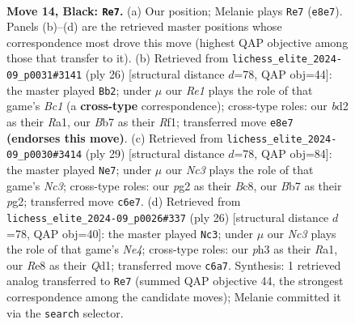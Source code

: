 \documentclass[11pt]{article}
\begin{document}
\clearpage

\begin{figure}[p]\centering
\begin{subfigure}{0.46\textwidth}\centering
\resizebox{\linewidth}{!}{%
\newchessgame
\chessboard[
  setfen={r2qrbk1/1bp2pp1/p1np3p/1p1Bp3/4P3/P2P1N1P/1PPB1PP1/R2QR1K1 b - - 0 14},
  showmover=false,
  pgfstyle=straightmove, color=movearrow, markmove={e8-e7}
]}
\caption{}
\end{subfigure}\hfill
\begin{subfigure}{0.46\textwidth}\centering
\resizebox{\linewidth}{!}{%
\newchessgame
\chessboard[
  setfen={r2q1rk1/pp3pp1/3pbn1p/4p3/1P1bP3/P1NB3P/2P1QPP1/R1B2RK1 w - - 0 14},
  showmover=false,
  pgfstyle=straightmove, color=movearrow, markmove={c1-b2}
]}
\caption{}
\end{subfigure}
\\[4pt]
\begin{subfigure}{0.46\textwidth}\centering
\resizebox{\linewidth}{!}{%
\newchessgame
\chessboard[
  setfen={1rbqrbk1/2p2pp1/2np3p/1p1Bp3/4P3/2PPBN1P/1P3PP1/R2Q1RK1 b - - 0 15},
  showmover=false,
  pgfstyle=straightmove, color=movearrow, markmove={c6-e7}
]}
\caption{}
\end{subfigure}\hfill
\begin{subfigure}{0.46\textwidth}\centering
\resizebox{\linewidth}{!}{%
\newchessgame
\chessboard[
  setfen={r2q1rk1/1p2bpp1/2p1pn1p/p4b2/2PPN3/1P4P1/PB3PBP/R2Q1RK1 w - - 1 14},
  showmover=false,
  pgfstyle=straightmove, color=movearrow, markmove={e4-c3}
]}
\caption{}
\end{subfigure}
\caption{\textbf{Move 14, Black: \texttt{Re7}.} (a) Our position; Melanie plays \texttt{Re7} (\texttt{e8e7}). Panels (b)--(d) are the retrieved master positions whose correspondence most drove this move (highest QAP objective among those that transfer to it). (b) Retrieved from \texttt{lichess\_elite\_2024-09\_p0031\#3141} (ply 26) [structural distance $d$=78, QAP obj=44]: the master played \texttt{Bb2}; under $\mu$ our \emph{Re1} plays the role of that game's \emph{Bc1} (a \textbf{cross-type} correspondence); cross-type roles: our \emph{b}d2 as their \emph{R}a1, our \emph{B}b7 as their \emph{R}f1; transferred move \texttt{e8e7} \textbf{(endorses this move)}. (c) Retrieved from \texttt{lichess\_elite\_2024-09\_p0030\#3414} (ply 29) [structural distance $d$=78, QAP obj=84]: the master played \texttt{Ne7}; under $\mu$ our \emph{Nc3} plays the role of that game's \emph{Nc3}; cross-type roles: our \emph{p}g2 as their \emph{B}c8, our \emph{B}b7 as their \emph{p}g2; transferred move \texttt{c6e7}. (d) Retrieved from \texttt{lichess\_elite\_2024-09\_p0026\#337} (ply 26) [structural distance $d$=78, QAP obj=40]: the master played \texttt{Nc3}; under $\mu$ our \emph{Nc3} plays the role of that game's \emph{Ne4}; cross-type roles: our \emph{p}h3 as their \emph{R}a1, our \emph{R}e8 as their \emph{Q}d1; transferred move \texttt{c6a7}. Synthesis: 1 retrieved analog transferred to \texttt{Re7} (summed QAP objective 44, the strongest correspondence among the candidate moves); Melanie committed it via the \texttt{search} selector.}
\label{fig:thought-m27}
\end{figure}
\end{document}
